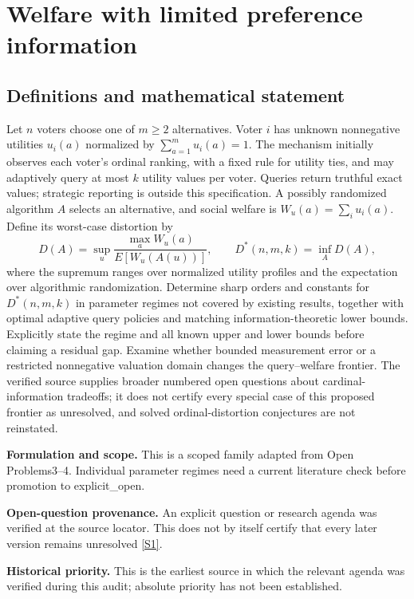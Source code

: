 \documentclass[11pt]{article}
\newcommand{\sref}[2]{\hyperlink{source:#1:#2}{[S#2]}}
\begin{document}
\section*{Welfare with limited preference information}\label{30007561}
\subsection{Definitions and mathematical statement}
Let \(n\) voters choose one of \(m\geq2\) alternatives. Voter \(i\) has unknown nonnegative utilities \(u_i(a)\) normalized by \(\sum_{a=1}^m u_i(a)=1\). The mechanism initially observes each voter's ordinal ranking, with a fixed rule for utility ties, and may adaptively query at most \(k\) utility values per voter. Queries return truthful exact values; strategic reporting is outside this specification. A possibly randomized algorithm \(A\) selects an alternative, and social welfare is \(W_u(a)=\sum_i u_i(a)\). Define its worst-case distortion by
\[
 D(A)=\sup_u\frac{\max_a W_u(a)}{E[W_u(A(u))]},\qquad
 D^*(n,m,k)=\inf_A D(A),
\]
where the supremum ranges over normalized utility profiles and the expectation over algorithmic randomization. Determine sharp orders and constants for \(D^*(n,m,k)\) in parameter regimes not covered by existing results, together with optimal adaptive query policies and matching information-theoretic lower bounds. Explicitly state the regime and all known upper and lower bounds before claiming a residual gap. Examine whether bounded measurement error or a restricted nonnegative valuation domain changes the query–welfare frontier. The verified source supplies broader numbered open questions about cardinal-information tradeoffs; it does not certify every special case of this proposed frontier as unresolved, and solved ordinal-distortion conjectures are not reinstated.

\par\textbf{Formulation and scope.} This is a scoped family adapted from Open Problems3–4. Individual parameter regimes need a current literature check before promotion to explicit\_open.

\par\textbf{Open-question provenance.} An explicit question or research agenda was verified at the source locator. This does not by itself certify that every later version remains unresolved \sref{30007561}{1}.

\par\textbf{Historical priority.} This is the earliest source in which the relevant agenda was verified during this audit; absolute priority has not been established.
\end{document}
